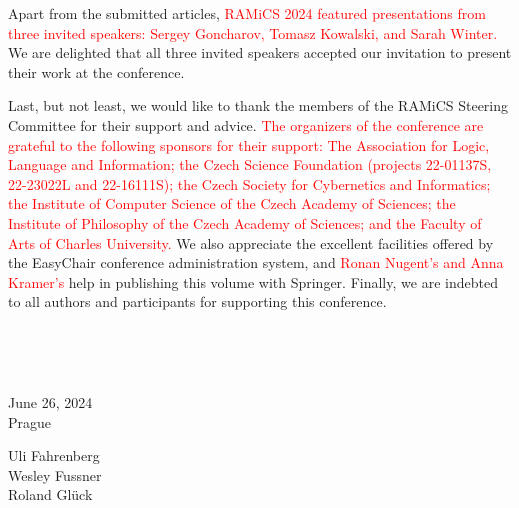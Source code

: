 \documentclass{llncs}
\newcommand{\red}[1]{\textcolor{red}{#1}}
\begin{document}
Apart from the submitted articles,\red{ RAMiCS 2024 featured presentations from 
three invited speakers: Sergey Goncharov, Tomasz Kowalski, and Sarah Winter.} 
We are delighted that all three invited speakers accepted our invitation to 
present their work at the conference.

Last, but not least, we would like to thank the members of the RAMiCS
Steering Committee for their support and advice. \red{The organizers of the conference are grateful to the following sponsors for their support: The Association for Logic, Language and Information; the Czech Science Foundation (projects 22-01137S, 22-23022L and 22-16111S); the Czech Society for Cybernetics and Informatics; the Institute of Computer Science of the Czech Academy of Sciences; the Institute of Philosophy of the Czech Academy of Sciences; and the Faculty of Arts of Charles University.}
We also appreciate the excellent facilities offered by the EasyChair
conference administration system, and \red{Ronan Nugent's and Anna
  Kramer's} help in publishing this volume with Springer. Finally, we
are indebted to all authors and participants for supporting this
conference.

 



~\bigskip


\noindent
\begin{minipage}[t]{.4\textwidth}
June 26, 2024\\
Prague
\end{minipage}%
\hfill
\begin{minipage}[t]{.4\textwidth}\flushright
  Uli Fahrenberg \\
  Wesley Fussner \\
  Roland Gl\"uck
\end{minipage}
\end{document}
